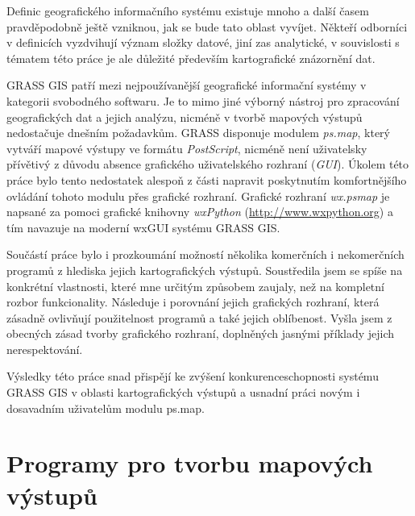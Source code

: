 \documentclass[a4paper,12pt,draft]{article}
\newcommand{\modul}[1]{\emph{#1}}
\begin{document}
Definic geografického informačního systému existuje mnoho
a další časem pravděpodobně ještě vzniknou, jak se bude tato oblast
vyvíjet. Někteří odborníci v definicích vyzdvihují význam složky
datové, jiní zas analytické, v souvislosti s tématem této práce je
ale důležité především kartografické znázornění dat.

GRASS GIS \cite{grass_page} patří mezi nejpoužívanější geografické informační
systémy v kategorii svobodného softwaru. Je to mimo jiné výborný nástroj
pro zpracování geografických dat  a jejich analýzu, nicméně v tvorbě mapových
výstupů nedostačuje dnešním požadavkům. GRASS disponuje modulem \modul{ps.map},
který
vytváří mapové výstupy ve formátu \emph{PostScript}, nicméně není uživatelsky
přívětivý z důvodu absence grafického uživatelského rozhraní (\emph{GUI}).
Úkolem této práce
bylo tento nedostatek alespoň z části napravit  poskytnutím
komfortnějšího ovládání tohoto modulu přes grafické rozhraní.
Grafické rozhraní \emph{wx.psmap} je napsané za pomoci grafické knihovny
\emph{wxPython} (\url{http://www.wxpython.org}) a tím navazuje na moderní
wxGUI \cite{wxGUI_clanek} systému GRASS GIS.

Součástí práce bylo i prozkoumání možností několika komerčních i nekomerčních
programů z hlediska jejich kartografických výstupů. Soustředila jsem se spíše
na konkrétní vlastnosti, které mne určitým způsobem zaujaly, než na kompletní
rozbor funkcionality. Následuje i porovnání jejich grafických rozhraní, která
zásadně ovlivňují použitelnost programů a také jejich oblíbenost. Vyšla jsem z
obecných zásad tvorby grafického rozhraní, doplněných jasnými příklady jejich
nerespektování. 

Výsledky této práce snad přispějí ke zvýšení konkurenceschopnosti systému GRASS
GIS v oblasti kartografických výstupů a usnadní práci novým i dosavadním
uživatelům modulu ps.map.

\newpage
\section{Programy pro tvorbu mapových výstupů}
\end{document}
